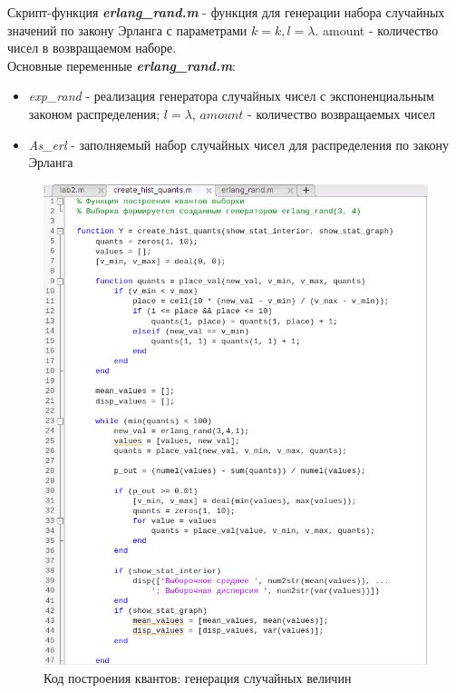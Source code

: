 \documentclass[12pt]{article}
\begin{document}
Скрипт-функция \textbf{\textit{erlang\_rand.m}} - функция для генерации набора случайных значений по закону Эрланга с параметрами $k = k, l = \lambda$. amount - количество чисел в возвращаемом наборе.\\

Основные переменные \textbf{\textit{erlang\_rand.m}}:
\begin{itemize}
	\item {\textit{exp\_rand}} - реализация генератора случайных чисел с экспоненциальным законом распределения; $l = \lambda$, $amount$ - количество возвращаемых чисел
	\item \textit{As\_erl} - заполняемый набор случайных чисел для распределения по закону Эрланга
\end{itemize}

\newpage

\begin{figure}[!h]
	\centering
	\includegraphics[width=1.04\linewidth]{hists_code_1.png}
	\caption{Код построения квантов: генерация случайных величин}
\end{figure}
\end{document}
